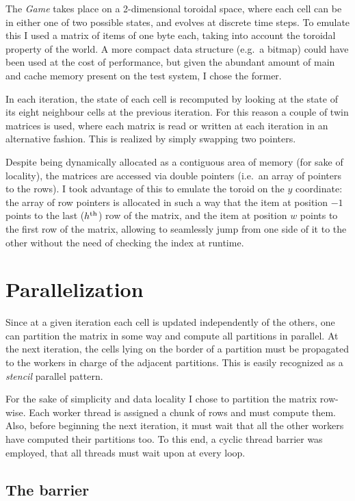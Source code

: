\documentclass[a4paper,11pt]{article}
\begin{document}
The \emph{Game} takes place on a 2-dimensional toroidal space, where each cell can be in either one of two possible states, and evolves at discrete time steps. To emulate this I used a matrix of items of one byte each, taking into account the toroidal property of the world. A more compact data structure (e.g.\ a bitmap) could have been used at the cost of performance, but given the abundant amount of main and cache memory present on the test system, I chose the former.

In each iteration, the state of each cell is recomputed by looking at the state of its eight neighbour cells at the previous iteration. For this reason a couple of twin matrices is used, where each matrix is read or written at each iteration in an alternative fashion. This is realized by simply swapping two pointers.

Despite being dynamically allocated as a contiguous area of memory (for sake of locality), the matrices are accessed via double pointers (i.e.\ an array of pointers to the rows). I took advantage of this to emulate the toroid on the $y$ coordinate: the array of row pointers is allocated in such a way that the item at position $-1$ points to the last ($h^\textrm{\scriptsize{th}}$) row of the matrix, and the item at position $w$ points to the first row of the matrix, allowing to seamlessly jump from one side of it to the other without the need of checking the index at runtime.

\section{Parallelization}

Since at a given iteration each cell is updated independently of the others, one can partition the matrix in some way and compute all partitions in parallel. At the next iteration, the cells lying on the border of a partition must be propagated to the workers in charge of the adjacent partitions. This is easily recognized as a \emph{stencil} parallel pattern.

For the sake of simplicity and data locality I chose to partition the matrix row-wise. Each worker thread is assigned a chunk of rows and must compute them. Also, before beginning the next iteration, it must wait that all the other workers have computed their partitions too. To this end, a cyclic thread barrier was employed, that all threads must wait upon at every loop.

\subsection{The barrier}
\end{document}
